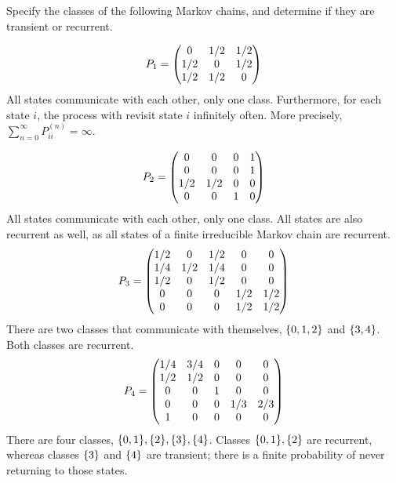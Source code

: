 \documentclass{article}
\begin{document}
    \nextproblem

    \begin{problem}
        Specify the classes of the following Markov chains, and determine if they are transient or recurrent. 
    \end{problem}

    \begin{solution}
        \begin{equation*}
            P_1 = \begin{pmatrix} 0 & 1/2 & 1/2 \\ 1/2 & 0 & 1/2 \\ 1/2 & 1/2 & 0 \end{pmatrix}
        \end{equation*}
        All states communicate with each other, only one class. Furthermore, for each state $i$, the process with revisit state $i$ infinitely often. More precisely, $\sum_{n=0}^\infty P_{ii}^{(n)} = \infty$.

        \begin{equation*}
            P_2 = \begin{pmatrix} 0 & 0 & 0 & 1 \\ 0 & 0 & 0 & 1 \\ 1/2 & 1/2 & 0 & 0 \\ 0 & 0 & 1 & 0 \end{pmatrix}
        \end{equation*}
        All states communicate with each other, only one class. All states are also recurrent as well, as all states of a finite irreducible Markov chain are recurrent.
        \begin{equation*}
            P_3 = \begin{pmatrix} 1/2 & 0 & 1/2 & 0 & 0 \\
                          1/4 & 1/2 & 1/4 & 0 & 0 \\
                          1/2 & 0 & 1/2 & 0 & 0 \\
                          0 & 0 & 0 & 1/2 & 1/2 \\
                          0 & 0 & 0 & 1/2 & 1/2 \\ \end{pmatrix}           
        \end{equation*}
        There are two classes that communicate with themselves, $\{0, 1, 2\}$ and $\{3, 4\}$. Both classes are recurrent.
        \begin{equation*}
            P_4 = \begin{pmatrix} 1/4 & 3/4 & 0 & 0 & 0 \\
                          1/2 & 1/2 & 0 & 0 & 0 \\
                          0 & 0 & 1 & 0 & 0 \\
                          0 & 0 & 0 & 1/3 & 2/3 \\
                          1 & 0 & 0 & 0 & 0 \\ \end{pmatrix}
        \end{equation*}
        There are four classes, $\{0, 1\}, \{2\}, \{3\}, \{4\}$. Classes $\{0, 1\}, \{2\}$ are recurrent, whereas classes $\{3\}$ and $\{4\}$ are transient; there is a finite probability of never returning to those states.
    \end{solution}
\end{document}
